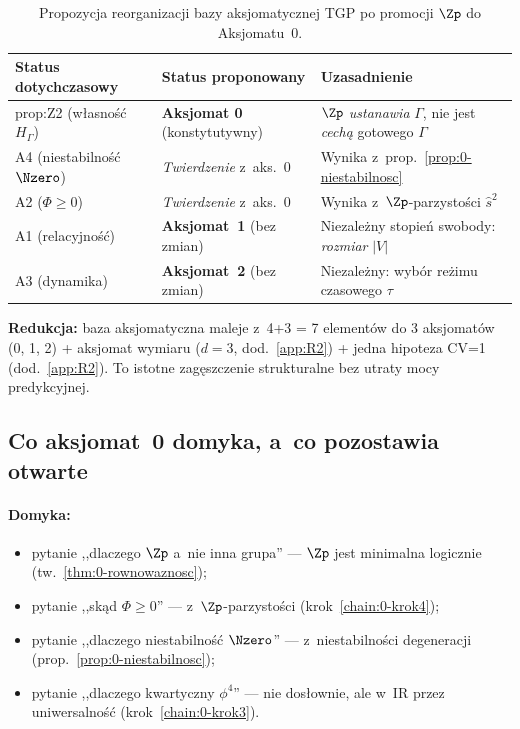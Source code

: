 \begin{table}[h]
\centering
\begin{tabular}{lll}
\toprule
Status dotychczasowy & Status proponowany & Uzasadnienie \\
\midrule
prop:Z2 (w\l{}asno\'s\'c $H_\Gamma$) &
  \textbf{Aksjomat 0} (konstytutywny) &
  $\Zp$ \emph{ustanawia} $\Gamma$, nie jest \emph{cech\k{a}}
  gotowego $\Gamma$ \\
A4 (niestabilność $\Nzero$) &
  \emph{Twierdzenie} z~aks.~0 &
  Wynika z~prop.~\ref{prop:0-niestabilnosc} \\
A2 ($\Phi \geq 0$) &
  \emph{Twierdzenie} z~aks.~0 &
  Wynika z~$\Zp$-parzysto\'sci $\hat{s}^2$ \\
A1 (relacyjno\'s\'c) &
  \textbf{Aksjomat~1} (bez zmian) &
  Niezale\.zny stopień swobody: \emph{rozmiar} $|V|$ \\
A3 (dynamika) &
  \textbf{Aksjomat~2} (bez zmian) &
  Niezale\.zny: wyb\'or re\.zimu czasowego $\tau$ \\
\bottomrule
\end{tabular}
\caption{Propozycja reorganizacji bazy aksjomatycznej TGP po
promocji $\Zp$ do Aksjomatu~0.}
\label{tab:0-reorganizacja}
\end{table}

\textbf{Redukcja:} baza aksjomatyczna maleje z~4+3 = 7 element\'ow
do 3 aksjomat\'ow (0, 1, 2) + aksjomat wymiaru ($d=3$, dod.~\ref{app:R2})
+ jedna hipoteza CV=1 (dod.~\ref{app:R2}). To istotne zag\k{e}szczenie
strukturalne bez utraty mocy predykcyjnej.

\subsection{Co aksjomat~0 domyka, a~co pozostawia otwarte}%
\label{app:0-otwarte}

\paragraph{Domyka:}
\begin{itemize}[nosep]
  \item pytanie ,,dlaczego $\Zp$ a~nie inna grupa'' ---
    $\Zp$ jest minimalna logicznie (tw.~\ref{thm:0-rownowaznosc});
  \item pytanie ,,sk\k{a}d $\Phi \geq 0$'' ---
    z~$\Zp$-parzysto\'sci (krok~\ref{chain:0-krok4});
  \item pytanie ,,dlaczego niestabilność $\Nzero$'' ---
    z~niestabilności degeneracji (prop.~\ref{prop:0-niestabilnosc});
  \item pytanie ,,dlaczego kwartyczny $\phi^4$'' ---
    nie dos\l{}ownie, ale w~IR przez uniwersalno\'s\'c
    (krok~\ref{chain:0-krok3}).
\end{itemize}

